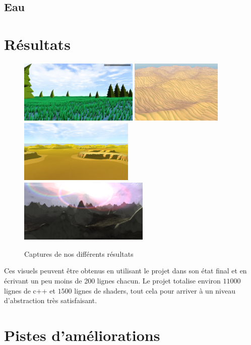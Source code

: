 \documentclass{EPUProjetDi}
\begin{document}
\section{Eau}



\chapter{Résultats}

\begin{figure}[ht]
	\centering
	\includegraphics[height=3cm]{final_trees}
	\includegraphics[height=3cm]{final_desert}
	\includegraphics[height=3cm]{final_mesa}
	\includegraphics[height=3cm]{final_mountains}
	\caption{Captures de nos différents résultats}
	\label{fig:final}
\end{figure}

Ces visuels peuvent être obtenus en utilisant le projet dans son état final et en écrivant un peu moins de 200 lignes chacun. Le projet totalise environ $11000$ lignes de c++ et $1500$ lignes de shaders, tout cela pour arriver à un niveau d'abstraction très satisfaisant.

\chapter{Pistes d'améliorations}
\end{document}
